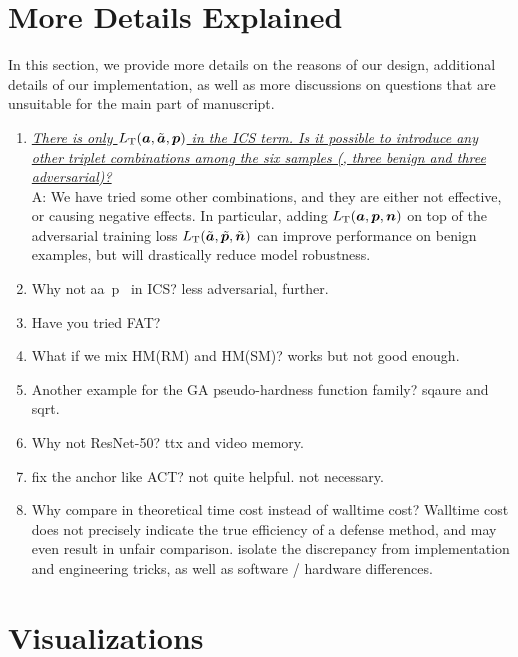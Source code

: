 \newpage
\appendix

\section{More Details Explained}

In this section, we provide more details on the reasons of our design,
additional details of our implementation, as well as more discussions
on questions that are unsuitable for the main part of manuscript.

\begin{enumerate}[noitemsep, label={Q.{\arabic*}}]
	\item \ul{\it There is only $L_\text{T}({\bm{a}}, \tilde{{\bm{a}}}, {\bm{p}})$ in the ICS
		term.  Is it possible to introduce any other triplet combinations among
		the six samples (\ie, three benign and three adversarial)?}\\
		A: We have tried some other combinations, and they are either not
		effective, or causing negative effects.
		In particular, adding $L_\text{T}({\bm{a}}, {\bm{p}}, {\bm{n}})$ on top of the
		adversarial training loss
		$L_\text{T}(\tilde{{\bm{a}}},\tilde{{\bm{p}}},\tilde{{\bm{n}}})$ can improve
		performance on benign examples, but will drastically reduce model
		robustness.

	\item Why not aa~p~ in ICS?
		less adversarial, further.
	\item Have you tried FAT?
	\item What if we mix HM(RM) and HM(SM)?
		works but not good enough.
	\item Another example for the GA pseudo-hardness function family?
		sqaure and sqrt.
	\item Why not ResNet-50?
		ttx and video memory.
	\item fix the anchor like ACT?
		not quite helpful. not necessary.
	\item Why compare in theoretical time cost instead of walltime cost?
		Walltime cost does not precisely indicate the true efficiency
		of a defense method, and may even result in unfair comparison.
		isolate the discrepancy from implementation and engineering tricks,
		as well as software / hardware differences.
\end{enumerate}

\section{Visualizations}

